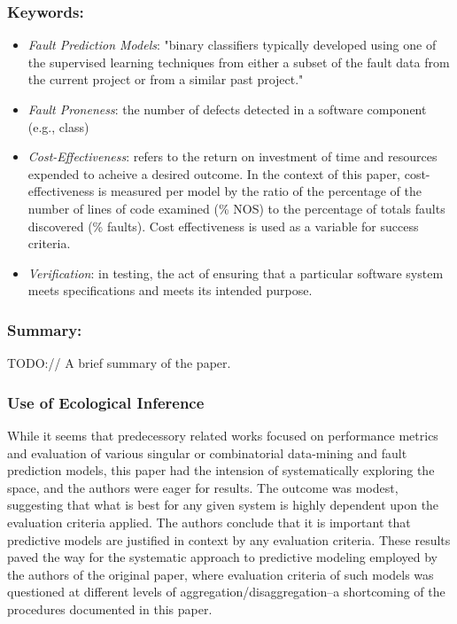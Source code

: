 \documentclass{sig-alternate-05-2015}
\begin{document}
\subsubsection{Keywords:}
\begin{itemize}
\item \emph{Fault Prediction Models}: "binary classifiers typically developed using one of the supervised learning techniques from either a subset of the fault data from the current project or from a similar past project." \cite{Yue:2009}
\item \emph{Fault Proneness}: the number of defects detected in a software component (e.g., class)
\item \emph{Cost-Effectiveness}: refers to the return on investment of time and resources expended to acheive a desired outcome. In the context of this paper, cost-effectiveness is measured per model by the ratio of the percentage of the number of lines of code examined (\% NOS) to the percentage of totals faults discovered (\% faults). Cost effectiveness is used as a variable for success criteria.
\item \emph{Verification}: in testing, the act of ensuring that a particular software system meets specifications and meets its intended purpose.
\end{itemize} 

\subsubsection{Summary:}
TODO:// A brief summary of the paper.

\subsubsection{Use of Ecological Inference}
While it seems that predecessory related works focused on performance metrics and evaluation of various singular or combinatorial data-mining and fault prediction models, this paper had the intension of systematically exploring the space, and the authors were eager for results. The outcome was modest, suggesting that what is best for any given system is highly dependent upon the evaluation criteria applied. The authors conclude that it is important that predictive models are justified in context by any evaluation criteria. These results paved the way for the systematic approach to predictive modeling employed by the authors of the original paper, where evaluation criteria of such models was questioned at different levels of aggregation/disaggregation--a shortcoming of the procedures documented in this paper.
\end{document}
